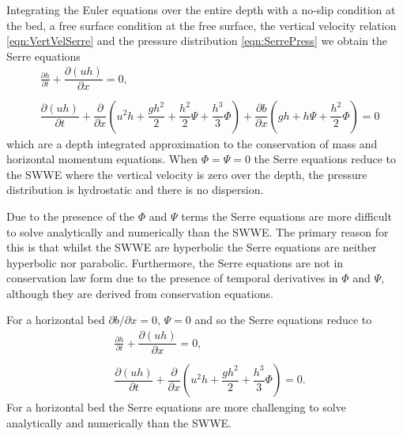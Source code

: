 Integrating the Euler equations \cite{Su-Gardener-1969-536,Zoppou-2014} over the entire depth with a no-slip condition at the bed, a free surface condition at the free surface, the vertical velocity relation \eqref{eqn:VertVelSerre} and the pressure distribution \eqref{eqn:SerrePress} we obtain the Serre equations
\begin{subequations}
	\begin{align}
	&\frac{\partial h}{\partial t} + \dfrac{\partial (uh)}{\partial x} = 0,  \label{eqn:FullSerreNonConMass} \\ \nonumber \\
	&\dfrac{\partial (uh)}{\partial t} + \dfrac{\partial}{\partial x} \left ( u^2h + \dfrac{gh^2}{2} + \dfrac{h^2}{2}{\Psi} + \dfrac{h^3}{3}{ \Phi }  \right )  +  \dfrac{\partial b}{\partial x} \left (gh +   h \Psi + \dfrac{h^2}{2}{ \Phi }  \right ) = 0	\label{eqn:FullSerreNonConMome}
	\end{align}
	\label{eqn:FullSerreNonCon}
\end{subequations}
which are a depth integrated approximation to the conservation of mass and horizontal momentum equations.
When $\Phi = \Psi = 0$ the Serre equations reduce to the SWWE where the vertical velocity is zero over the depth, the pressure distribution is hydrostatic and there is no dispersion. 

Due to the presence of the $\Phi$ and $\Psi$ terms the Serre equations are more difficult to solve analytically and numerically than the SWWE. The primary reason for this is that whilst the SWWE are hyperbolic the Serre equations are neither hyperbolic nor parabolic. Furthermore, the Serre equations are not in conservation law form due to the presence of temporal derivatives in $\Phi$ and $\Psi$, although they are derived from conservation equations. 

For a horizontal bed $\partial b / \partial x = 0$, $\Psi = 0$ and so the Serre equations reduce to
\begin{subequations}
	\label{eqn:FullSerreNonConHorizbed}
	\begin{align}
	\label{eqn:FullSerreNonConMassHorizbed}
	&\frac{\partial h}{\partial t} + \dfrac{\partial (uh)}{\partial x} = 0, \\ \nonumber \\
	\label{eqn:FullSerreNonConMomeHorizbed}
	&\dfrac{\partial (uh)}{\partial t} + \dfrac{\partial}{\partial x} \left ( u^2h + \dfrac{gh^2}{2} + \dfrac{h^3}{3}{ \Phi }  \right ) = 0.
	\end{align}
\end{subequations}	
For a horizontal bed the Serre equations are more challenging to solve analytically and numerically than the SWWE. 

